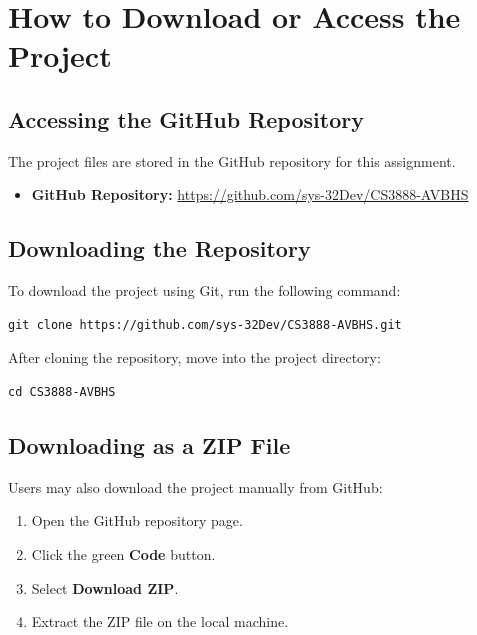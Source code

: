 \documentclass[12pt]{article}
\begin{document}
\section{How to Download or Access the Project}

\subsection{Accessing the GitHub Repository}
The project files are stored in the GitHub repository for this assignment.

\begin{itemize}[noitemsep]
    \item \textbf{GitHub Repository:} \url{https://github.com/sys-32Dev/CS3888-AVBHS}
\end{itemize}

\subsection{Downloading the Repository}
To download the project using Git, run the following command:

\begin{verbatim}
git clone https://github.com/sys-32Dev/CS3888-AVBHS.git
\end{verbatim}

After cloning the repository, move into the project directory:

\begin{verbatim}
cd CS3888-AVBHS
\end{verbatim}

\subsection{Downloading as a ZIP File}
Users may also download the project manually from GitHub:

\begin{enumerate}[noitemsep]
    \item Open the GitHub repository page.
    \item Click the green \textbf{Code} button.
    \item Select \textbf{Download ZIP}.
    \item Extract the ZIP file on the local machine.
\end{enumerate}

\end{document}
